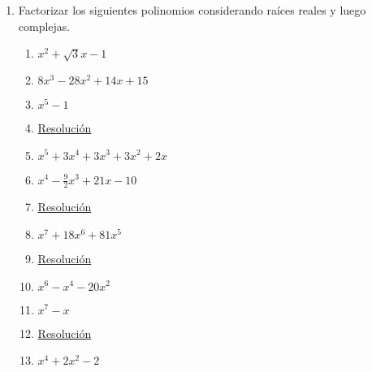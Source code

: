 \documentclass[a4paper]{article}
\newcommand{\answer}{\item[**]}
\newcommand{\exercise}{\item}
\newcommand{\df}[2]{\displaystyle\frac{#1}{#2}}
\begin{document}
\begin{enumerate}
\begin{multicols}{2}
\begin{enumerate} [label=(\alph*)]
		\item $\alpha P(x)^2 = Q(x) +\beta$ \\con $P(x)=x-1$ y $Q(x)=2x^2-4x$
		\item $\alpha P(x)-\beta Q(x) = -2x^2 +7x-3$ \\con $P(x)=x-1$ y $Q(x)=2x^2-4x$
		\item $gr\left(\alpha P(x)^2 - Q(x)\right)=gr\left(P(x)\right)$ \\con $P(x)=x-1$ y $Q(x)=2x^2-4x$
		\item $Q(\alpha)=P(4)$ \\con $P(x)=x-1$ y $Q(x)=2x^2-4x$

		\item $3x^2+mx+4$ tiene a 1 como raíz
		\answer \href{https://youtu.be/09D5Z3dcaXc}{Resolución}

		\item $x^3+ax^2+bx+5$ es divisible por $Q(x)=x^2+x+1$
		\answer \href{https://youtu.be/jE5a43IQ91E}{Resolución}

	\end{enumerate}
	\end{multicols}

	\exercise Factorizar los siguientes polinomios considerando raíces reales y luego complejas.

	\begin{multicols}{2}
	\begin{enumerate} [label=(\alph*)]
		
		\item $x^2+\sqrt{3}x-1$
		\item $8x^3-28x^2+14x+15$

		\item $x^5-1$
		\answer \href{https://youtu.be/ZMBXAdxOleM}{Resolución}

		\item $x^5+3x^4+3x^3+3x^2+2x$
		
		\item $x^4-\df{9}{2}x^3+21x-10$
		\answer \href{https://youtu.be/1V06bnuaadA}{Resolución}

		\item $x^7+18x^6+81x^5$
		\answer \href{https://youtu.be/Z1KatpJM2eU}{Resolución}

		\item $x^6-x^4-20x^2$
		
		\item $x^7-x$
		\answer \href{https://youtu.be/EQIEmdkGOZE}{Resolución}

		\item $x^4+2x^2-2$


\end{enumerate}
\end{multicols}
\end{enumerate}
\end{document}
